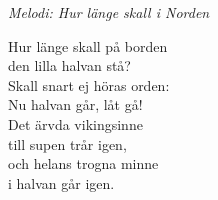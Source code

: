 {\footnotesize\textit{Melodi: Hur länge skall i Norden}}\par
\vspace{10pt}
\revrpt Hur länge skall på borden \\
den lilla halvan stå? \\
Skall snart ej höras orden: \\
Nu halvan går, låt gå!\rpt \\
\revrpt Det ärvda vikingsinne \\
till supen trår igen, \\
och helans trogna minne \\
i halvan går igen.\rpt
